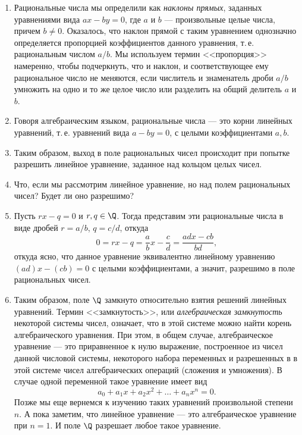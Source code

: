 \begin{enumerate}
\item Рациональные числа мы определили как \textit{наклоны прямых}, заданных уравнениями вида $ax-by=0$, где $a$ и $b$ --- произвольные целые числа, причем $b\ne 0$. Оказалось, что наклон прямой с таким уравнением однозначно определяется пропорцией коэффициентов данного уравнения, т.\,е. рациональным числом $a/b$. Мы используем термин <<пропорция>> намеренно, чтобы подчеркнуть, что и наклон, и соответствующее ему рациональное число не меняются, если числитель и знаменатель дроби $a/b$ умножить на одно и то же целое число или разделить на общий делитель $a$ и $b$.

\item Говоря алгебраическим языком, рациональные числа --- это корни линейных уравнений, т.\,е. уравнений вида $a-by=0$, с целыми коэффициентами $a,b$.
\item Таким образом, выход в поле рациональных чисел происходит при попытке разрешить линейное уравнение, заданное над кольцом целых чисел.
\item Что, если мы рассмотрим линейное уравнение, но над полем рациональных чисел? Будет ли оно разрешимо?
\item Пусть $rx-q=0$ и $r,q\in\Q$. Тогда представим эти рациональные числа в виде дробей $r=a/b$, $q=c/d$, откуда
$$
0=rx-q = \frac{a}{b}x-\frac{c}{d} = \frac{adx-cb}{bd},
$$
откуда ясно, что данное уравнение эквивалентно линейному уравнению $(ad)x-(cb)=0$ с целыми коэффициентами, а значит, разрешимо в поле рациональных чисел.
\item Таким образом, поле $\Q$ замкнуто относительно взятия решений линейных уравнений. Термин <<замкнутость>>, или \textit{алгебраическая замкнутость} некоторой системы чисел, означает, что в этой системе можно найти корень алгебраического уравнения. При этом, в общем случае, алгебраическое уравнение --- это приравненное к нулю выражение, построенное из чисел данной числовой системы, некоторого набора переменных и разрешенных в в этой системе чисел алгебраических операций (сложения и умножения). В случае одной переменной такое уравнение имеет вид
$$
a_0 + a_1x + a_2x^2 + \dots + a_nx^n = 0.
$$
Позже мы еще вернемся к изучению таких уравнений произвольной степени $n$. А пока заметим, что линейное уравнение --- это алгебраическое уравнение при $n=1$. И поле $\Q$ разрешает любое такое уравнение.


\end{enumerate}
